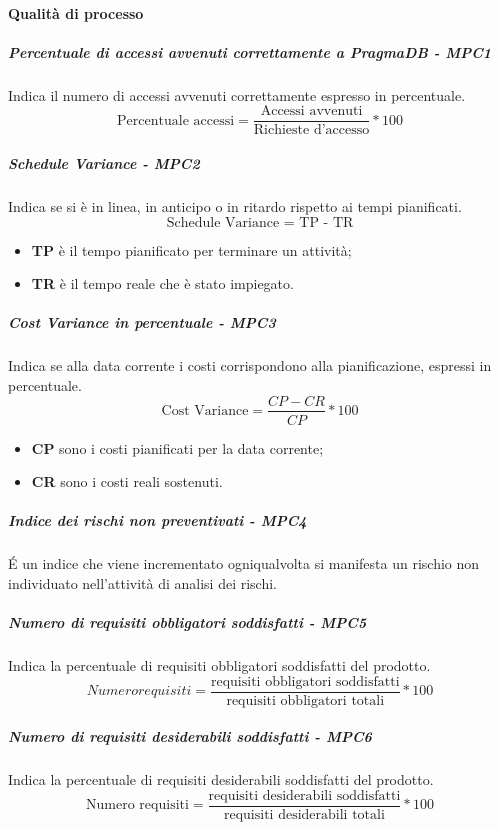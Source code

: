 \paragraph{Qualità di processo}
\subparagraph{Percentuale di accessi avvenuti correttamente a PragmaDB - MPC1}
Indica il numero  di accessi avvenuti correttamente espresso in percentuale.\\
\begin{equation*} 
\text{Percentuale accessi} = \frac{\text{Accessi avvenuti}}{\text{Richieste d'accesso}} * 100
\end{equation*}
\subparagraph{Schedule Variance - MPC2}
Indica se si è in linea, in anticipo o in ritardo rispetto ai tempi pianificati.\\
\begin{equation*}
\text{Schedule Variance = TP - TR} 
\end{equation*}
\begin{itemize}
	\item \textbf{TP} è il tempo pianificato per terminare un attività;
	\item \textbf{TR} è il tempo reale che è stato impiegato.
\end{itemize}		
\subparagraph{Cost Variance in percentuale - MPC3}
Indica se alla data corrente i costi corrispondono alla pianificazione, espressi in percentuale.
\begin{equation*}
\text{Cost Variance} = \frac{CP - CR}{CP} * 100
\end{equation*}
\begin{itemize}
	\item \textbf{CP} sono i costi pianificati per la data corrente;
	\item \textbf{CR} sono i costi reali sostenuti.
\end{itemize}
\subparagraph{Indice dei rischi non preventivati - MPC4}
É un indice che viene incrementato ogniqualvolta si manifesta un rischio non individuato nell'attività di analisi dei rischi.
\subparagraph{Numero di requisiti obbligatori soddisfatti - MPC5}
Indica la percentuale di requisiti obbligatori soddisfatti del prodotto.
\begin{equation*}
Numero requisiti = \frac{\text{requisiti obbligatori soddisfatti}}{\text{requisiti obbligatori totali}} * 100
\end{equation*}
\subparagraph{Numero di requisiti desiderabili soddisfatti - MPC6}
Indica la percentuale di requisiti desiderabili soddisfatti del prodotto.
\begin{equation*}
\text{Numero requisiti} = \frac{\text{requisiti desiderabili soddisfatti}}{\text{requisiti desiderabili totali}} * 100
\end{equation*}
